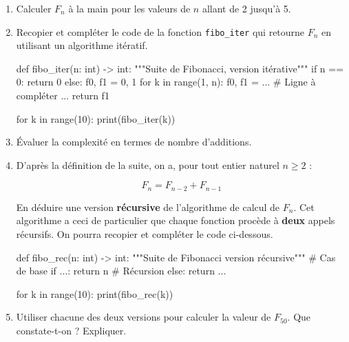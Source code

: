 \documentclass[
  letterpaper,
  DIV=11,
  numbers=noendperiod]{scrartcl}
\newenvironment{Shaded}{\begin{snugshade}}{\end{snugshade}}
\newcommand{\BuiltInTok}[1]{\textcolor[rgb]{0.00,0.23,0.31}{#1}}
\newcommand{\CommentTok}[1]{\textcolor[rgb]{0.37,0.37,0.37}{#1}}
\newcommand{\ControlFlowTok}[1]{\textcolor[rgb]{0.00,0.23,0.31}{#1}}
\newcommand{\DecValTok}[1]{\textcolor[rgb]{0.68,0.00,0.00}{#1}}
\newcommand{\KeywordTok}[1]{\textcolor[rgb]{0.00,0.23,0.31}{#1}}
\newcommand{\NormalTok}[1]{\textcolor[rgb]{0.00,0.23,0.31}{#1}}
\newcommand{\OperatorTok}[1]{\textcolor[rgb]{0.37,0.37,0.37}{#1}}
\begin{document}
\begin{enumerate}
\def\labelenumi{\arabic{enumi}.}
\item
  Calculer \(F_n\) à la main pour les valeurs de \(n\) allant de 2
  jusqu'à 5.
\item
  Recopier et compléter le code de la fonction \texttt{fibo\_iter} qui
  retourne \(F_n\) en utilisant un algorithme itératif.

\begin{Shaded}
\begin{Highlighting}[]
\KeywordTok{def}\NormalTok{ fibo\_iter(n: }\BuiltInTok{int}\NormalTok{) }\OperatorTok{{-}\textgreater{}} \BuiltInTok{int}\NormalTok{:}
    \CommentTok{"""Suite de Fibonacci, version itérative"""}
    \ControlFlowTok{if}\NormalTok{ n }\OperatorTok{==} \DecValTok{0}\NormalTok{:}
        \ControlFlowTok{return} \DecValTok{0}
    \ControlFlowTok{else}\NormalTok{:}
\NormalTok{        f0, f1 }\OperatorTok{=} \DecValTok{0}\NormalTok{, }\DecValTok{1}
        \ControlFlowTok{for}\NormalTok{ k }\KeywordTok{in} \BuiltInTok{range}\NormalTok{(}\DecValTok{1}\NormalTok{, n):}
\NormalTok{            f0, f1 }\OperatorTok{=}\NormalTok{ ...  }\CommentTok{\# Ligne à compléter ...}
        \ControlFlowTok{return}\NormalTok{ f1}


\ControlFlowTok{for}\NormalTok{ k }\KeywordTok{in} \BuiltInTok{range}\NormalTok{(}\DecValTok{10}\NormalTok{):}
    \BuiltInTok{print}\NormalTok{(fibo\_iter(k))}
\end{Highlighting}
\end{Shaded}
\item
  Évaluer la complexité en termes de nombre d'additions.
\item
  D'après la définition de la suite, on a, pour tout entier naturel
  \(n\geqslant 2\) :

  \[F_{n}=F_{n-2}+F_{n-1}\]

  En déduire une version \textbf{récursive} de l'algorithme de calcul de
  \(F_n\). Cet algorithme a ceci de particulier que chaque fonction
  procède à \textbf{deux} appels récursifs. On pourra recopier et
  compléter le code ci-dessous.

\begin{Shaded}
\begin{Highlighting}[]
\KeywordTok{def}\NormalTok{ fibo\_rec(n: }\BuiltInTok{int}\NormalTok{) }\OperatorTok{{-}\textgreater{}} \BuiltInTok{int}\NormalTok{:}
    \CommentTok{"""Suite de Fibonacci version récursive"""}
    \CommentTok{\# Cas de base}
    \ControlFlowTok{if}\NormalTok{ ...:}
        \ControlFlowTok{return}\NormalTok{ n}
    \CommentTok{\# Récursion}
    \ControlFlowTok{else}\NormalTok{:}
        \ControlFlowTok{return}\NormalTok{ ...}


\ControlFlowTok{for}\NormalTok{ k }\KeywordTok{in} \BuiltInTok{range}\NormalTok{(}\DecValTok{10}\NormalTok{):}
    \BuiltInTok{print}\NormalTok{(fibo\_rec(k))}
\end{Highlighting}
\end{Shaded}
\item
  Utiliser chacune des deux versions pour calculer la valeur de
  \(F_{50}\). Que constate-t-on ? Expliquer.
\end{enumerate}
\end{document}
